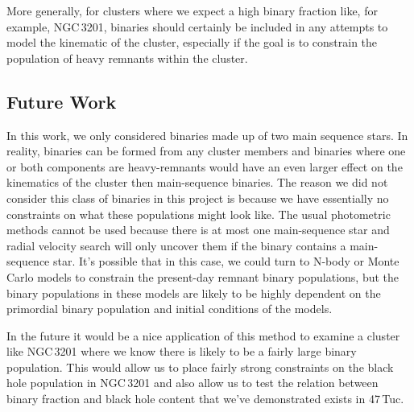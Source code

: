 More generally, for clusters where we expect a high binary fraction like, for example, NGC\,3201,
binaries should certainly be included in any attempts to model the kinematic of the cluster,
especially if the goal is to constrain the population of heavy remnants within the cluster.



\subsection{Future Work}



In this work, we only considered binaries made up of two main sequence stars. In reality, binaries
can be formed from any cluster members and binaries where one or both components are heavy-remnants
would have an even larger effect on the kinematics of the cluster then main-sequence binaries. The
reason we did not consider this class of binaries in this project is because we have essentially no
constraints on what these populations might look like. The usual photometric methods cannot be used
because there is at most one main-sequence star and radial velocity search will only uncover them if
the binary contains a main-sequence star. It's possible that in this case, we could turn to N-body
or Monte Carlo models to constrain the present-day remnant binary populations, but the binary
populations in these models are likely to be highly dependent on the primordial binary population
and initial conditions of the models.

In the future it would be a nice application of this method to examine a cluster like NGC\,3201
where we know there is likely to be a fairly large binary population. This would allow us to place
fairly strong constraints on the black hole population in NGC\,3201 and also allow us to test the
relation between binary fraction and black hole content that we've demonstrated exists in 47\,Tuc.